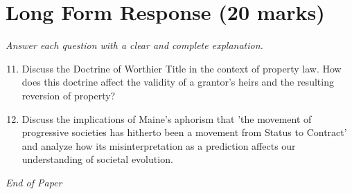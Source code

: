 \documentclass[12pt]{article}
\begin{document}
\section*{Long Form Response (20 marks)}
\textit{Answer each question with a clear and complete explanation.}
\begin{enumerate}[label=\arabic*.]
\setcounter{enumi}{10}
\item Discuss the Doctrine of Worthier Title in the context of property law. How does this doctrine affect the validity of a grantor's heirs and the resulting reversion of property?
\item Discuss the implications of Maine's aphorism that 'the movement of progressive societies has hitherto been a movement from Status to Contract' and analyze how its misinterpretation as a prediction affects our understanding of societal evolution.
\end{enumerate}

\vfill
\noindent\textit{End of Paper}
\end{document}
